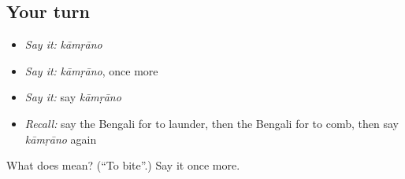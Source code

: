 \subsection*{Your turn}
\begin{itemize}
\raggedright
  \item \emph{Say it:} \emph{kāmṛāno}
  \item \emph{Say it:} \emph{kāmṛāno}, once more
  \item \emph{Say it:} say \emph{kāmṛāno}
  \item \emph{Recall:} say the Bengali for to launder, then the Bengali for to comb, then say \emph{kāmṛāno} again
\end{itemize}

\begin{tcolorbox}[breakable,colback=teal!4,colframe=teal!35!black,title={Before you move on}]
What does  mean? (\textquotedblleft{}To bite\textquotedblright{}.) Say it once more.
\end{tcolorbox}
